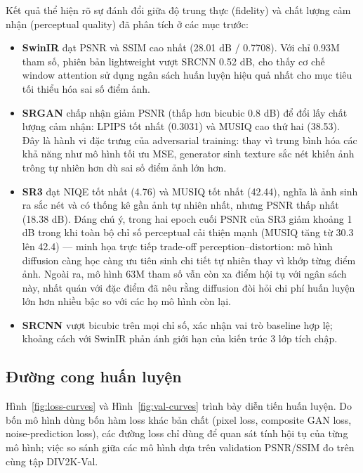 Kết quả thể hiện rõ sự đánh đổi giữa độ trung thực (fidelity) và chất lượng cảm
nhận (perceptual quality) đã phân tích ở các mục trước:

\begin{itemize}
\item \textbf{SwinIR} đạt PSNR và SSIM cao nhất (28.01 dB / 0.7708). Với chỉ
      0.93M tham số, phiên bản lightweight vượt SRCNN 0.52 dB, cho thấy cơ chế
      window attention sử dụng ngân sách huấn luyện hiệu quả nhất cho mục tiêu
      tối thiểu hóa sai số điểm ảnh.
\item \textbf{SRGAN} chấp nhận giảm PSNR (thấp hơn bicubic 0.8 dB) để đổi lấy
      chất lượng cảm nhận: LPIPS tốt nhất (0.3031) và MUSIQ cao thứ hai (38.53).
      Đây là hành vi đặc trưng của adversarial training: thay vì trung bình hóa
      các khả năng như mô hình tối ưu MSE, generator sinh texture sắc nét khiến
      ảnh trông tự nhiên hơn dù sai số điểm ảnh lớn hơn.
\item \textbf{SR3} đạt NIQE tốt nhất (4.76) và MUSIQ tốt nhất (42.44), nghĩa là
      ảnh sinh ra sắc nét và có thống kê gần ảnh tự nhiên nhất, nhưng PSNR thấp
      nhất (18.38 dB). Đáng chú ý, trong hai epoch cuối PSNR của SR3 giảm khoảng
      1 dB trong khi toàn bộ chỉ số perceptual cải thiện mạnh (MUSIQ tăng từ 30.3 lên
      42.4) --- minh họa trực tiếp trade-off perception--distortion: mô hình
      diffusion càng học càng ưu tiên sinh chi tiết tự nhiên thay vì khớp từng
      điểm ảnh. Ngoài ra, mô hình 63M tham số vẫn còn xa điểm hội tụ với ngân
      sách này, nhất quán với đặc điểm đã nêu rằng diffusion đòi hỏi chi phí
      huấn luyện lớn hơn nhiều bậc so với các họ mô hình còn lại.
\item \textbf{SRCNN} vượt bicubic trên mọi chỉ số, xác nhận vai trò baseline hợp
      lệ; khoảng cách với SwinIR phản ánh giới hạn của kiến trúc 3 lớp tích chập.
\end{itemize}

\subsection{Đường cong huấn luyện}

Hình~\ref{fig:loss-curves} và Hình~\ref{fig:val-curves} trình bày diễn tiến huấn
luyện. Do bốn mô hình dùng bốn hàm loss khác bản chất (pixel loss, composite GAN
loss, noise-prediction loss), các đường loss chỉ dùng để quan sát tính hội tụ của
từng mô hình; việc so sánh giữa các mô hình dựa trên validation PSNR/SSIM đo trên
cùng tập DIV2K-Val.

